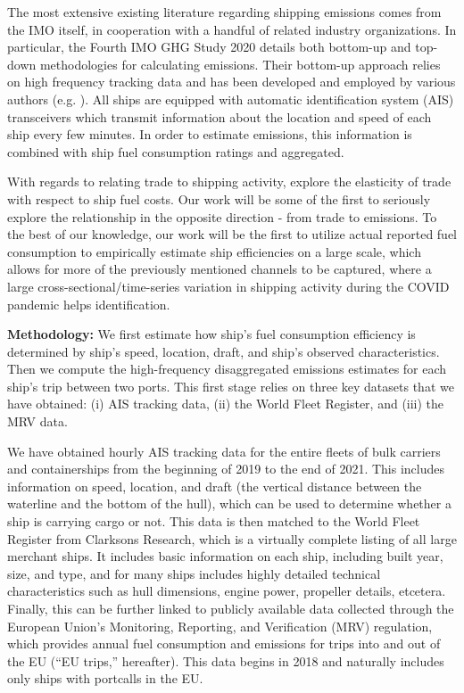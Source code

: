 \documentclass[hidelinks, 12pt,letterpaper]{article}
\begin{document}
The most extensive existing literature regarding shipping emissions comes from the IMO itself, in cooperation with a handful of related industry organizations. In particular, the Fourth IMO GHG Study 2020 \citep{faber2020fourth} details both bottom-up and top-down methodologies for calculating emissions. Their bottom-up approach relies on high frequency tracking data and has been developed and employed by various authors (e.g. \citet{olmer2017greenhouse, johansson2017global, jalkanen2009modelling, van2018spatially}). All ships are equipped with automatic identification system (AIS) transceivers which transmit information about the location and speed of each ship every few minutes. In order to estimate emissions, this information is combined with ship fuel consumption ratings and aggregated.

With regards to relating trade to shipping activity, \citet{brancaccio2018impact} explore the elasticity of trade with respect to ship fuel costs. Our work will be some of the first to seriously explore the relationship in the opposite direction - from trade to emissions. To the best of our knowledge, our work will be the first to utilize actual reported fuel consumption to empirically estimate ship efficiencies on a large scale, which allows for more of the previously mentioned channels to be captured, where a large cross-sectional/time-series variation in shipping activity during the COVID pandemic helps identification. %


\smallskip

\noindent \textbf{Methodology:}  We first estimate how ship's fuel consumption efficiency  is determined by ship's speed, location, draft, and ship's observed characteristics. Then we compute the  high-frequency disaggregated emissions estimates for each ship's trip  between two ports. This first stage relies on three key datasets that we have obtained: (i) AIS tracking data, (ii)  the World Fleet Register, and (iii) the MRV data.

We have obtained hourly AIS tracking data for the entire fleets of bulk carriers and containerships from the beginning of 2019 to the end of 2021. This includes information on speed, location, and draft (the vertical distance between the waterline and the bottom of the hull), which can be used to determine whether a ship is carrying cargo or not. This data is then matched to the World Fleet Register from Clarksons Research, which is a virtually complete listing of all large merchant ships. It includes basic  information on each ship, including built year, size, and type, and for many ships includes highly detailed technical characteristics such as hull dimensions, engine power, propeller details, etcetera. Finally, this can be further linked to publicly available data collected through the European Union's Monitoring, Reporting, and Verification (MRV) regulation, which provides annual fuel consumption and emissions for trips into and out of the EU (``EU trips,'' hereafter). This data begins in 2018 and naturally includes only ships with portcalls in the EU.
\end{document}
